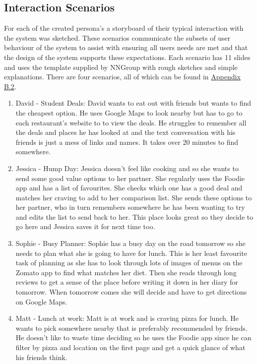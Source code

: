 \documentclass[a4 paper, 12pt]{article}
\begin{document}
    \subsection{Interaction Scenarios}
    For each of the created persona's a storyboard of their typical interaction with the system was sketched. These scenarios communicate the subsets of user behaviour of the system to assist with ensuring all users needs are met and that the design of the system supports these expectations. Each scenario has 11 slides and uses the template supplied by NNGroup with rough sketches and simple explanations. There are four scenarios, all of which can be found in \hyperref[sec:B.2]{Appendix B.2}.
        \begin{enumerate}
            \item David - Student Deals: David wants to eat out with friends but wants to find the cheapest option. He uses Google Maps to look nearby but has to go to each restaurant's website to to view the deals. He struggles to remember all the deals and places he has looked at and the text conversation with his friends is just a mess of links and names. It takes over 20 minutes to find somewhere.
            \item Jessica - Hump Day: Jessica doesn't feel like cooking and so she wants to send some good value options to her partner. She regularly uses the Foodie app and has a list of favourites. She checks which one has a good deal and matches her craving to add to her comparison list. She sends these options to her partner, who in turn remembers somewhere he has been wanting to try and edits the list to send back to her. This place looks great so they decide to go here and Jessica saves it for next time too.
            \item Sophie - Busy Planner: Sophie has a busy day on the road tomorrow so she needs to plan what she is going to have for lunch. This is her least favourite task of planning as she has to look through lots of images of menus on the Zomato app to find what matches her diet. Then she reads through long reviews to get a sense of the place before writing it down in her diary for tomorrow. When tomorrow comes she will decide and have to get directions on Google Maps.
            \item Matt - Lunch at work: Matt is at work and is craving pizza for lunch. He wants to pick somewhere nearby that is preferably recommended by friends. He doesn't like to waste time deciding so he uses the Foodie app since he can filter by pizza and location on the first page and get a quick glance of what his friends think. 
        \end{enumerate}
\end{document}
